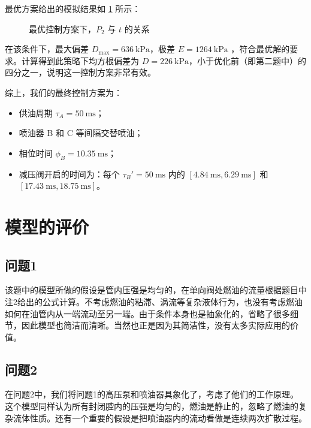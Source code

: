 \documentclass[withoutpreface,bwprint]{cumcmthesis}
\newcommand{\pre}{~\mathrm{kPa}}
\newcommand{\tim}{~\mathrm{ms}}
\newcommand{\pres}{/\mathrm{kPa}}
\newcommand{\tims}{/\mathrm{ms}}
\begin{document}
最优方案给出的模拟结果如 \ref{discontinuumPt} 所示：

\begin{figure}[!ht]
	\centering
	\caption{最优控制方案下，$P_2$ 与 $t$ 的关系}
	\label{discontinuumPt}
\end{figure}

在该条件下，最大偏差 $D_{\max}=636\pre$，极差 $E=1264\pre$ ，符合最优解的要求。计算得到此策略下均方根偏差为 $D=226\pre$，小于优化前（即第二题中）的四分之一，说明这一控制方案非常有效。

综上，我们的最终控制方案为：
\begin{itemize}
	\item 供油周期 $\tau_A=50\tim$；
	\item 喷油器 B 和 C 等间隔交替喷油；
	\item 相位时间 $\phi_B=10.35\tim$；
	\item 减压阀开启的时间为：每个 $\tau_B'=50\tim$ 内的 $[4.84\tim,6.29\tim]$ 和 $[17.43\tim, 18.75\tim]$。
\end{itemize}

\newpage
\section{模型的评价} %
\subsection{问题1}
	该题中的模型所做的假设是管内压强是均匀的，在单向阀处燃油的流量根据题目中注2给出的公式计算。不考虑燃油的粘滞、涡流等复杂液体行为，也没有考虑燃油如何在油管内从一端流动至另一端。由于条件本身也是抽象化的，省略了很多细节，因此模型也简洁而清晰。当然也正是因为其简洁性，没有太多实际应用的价值。
\subsection{问题2}
	在问题2中，我们将问题1的高压泵和喷油器具象化了，考虑了他们的工作原理。
	这个模型同样认为所有封闭腔内的压强是均匀的，燃油是静止的，忽略了燃油的复杂流体性质。还有一个重要的假设是把喷油器内的流动看做是连续两次扩散过程。
	
\end{document}
